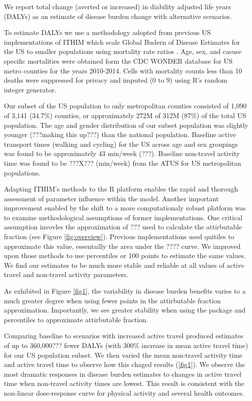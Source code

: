 We report total change (averted or increased) in diability adjusted
life years (DALYs) as an estimate of disease burden change with
alternative scenarios.

To estimate DALYs we use a methodology adopted from previous US
implementations of ITHIM which scale Global Budern of Disease
Estimates for the US to smaller populations using mortality rate
ratios \cite{maizlish2013}. Age, sex, and casuse specific mortalities
were obtained form the CDC WONDER database for US metro counties for
the years 2010-2014. Cells with mortality counts less than 10 deaths were suppressed for privacy and imputed (0 to 9) using
R's random integer generator.

Our subset of the US population to only metropolitan counties
consisted of 1,090 of 3,141 (34.7\%) counties, or approximately 272M of 312M
(87\%) of the total US population. The age and gender
distribution of our subset population was slightly younger (???making
this up???) than the national population. Baseline active transport times
(walking and cycling) for the US across age and sex groupings was found to be approximately 43 min/week (???). Baseline non-travel activity time was found to be ???X??? (min/week) from the ATUS for US metropolitan
populations.

Adapting ITHIM's methods to the R platform enables the rapid and
thorough assessment of parameter influence within the model. Another
important improvement enabled by the shift to a more computationaly
robust platform was to examine methodological assumptions of former
implementations. One critical assumption invovles the approximation of
??? used to calculate the attirbutable fraction (see
Figure \ref{fig:overview}). Previous implementations used quitiles to
approximate this value, essentailly the area under the ???? curve. We
improved upon those methods to use percentiles or 100 points to
estimate the same values. We find our estimates to be much more stable
and reliable at all values of active travel and non-travel activity
parameters.

As exhibited in Figure \ref{fig1}, the variability in disease burden
benefits varies to a much greater degree when using fewer points in the
attirbutable fraction approximation. Importantly, we see greater stability when using
the package and percentiles to approximate attirbutable fraction. 

Comparing baseline to scenarios with increased active travel produced estimates of up to
360,000??? fewer DALYs (with 300\% increase in mean active travel time) for our US population subset. We then varied the mean non-travel activity time and active
travel time to observe how this chaged results (\ref{fig1}). We
observe the most dramatic responses in disease burden estimates to
changes in active travel time when non-travel activity times are
lowest. This result is consistent with the non-linear dose-response
curve for physical activity and several health outcomes. 

